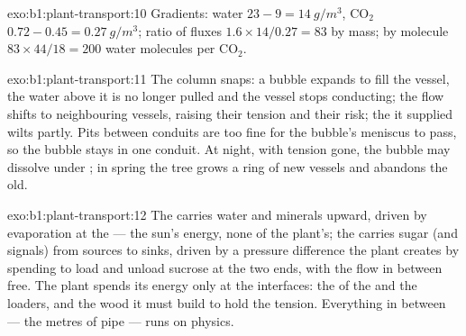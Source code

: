 \begin{solution}{exo:b1:plant-transport:10}
Gradients: water $23 - 9 = \qty{14}{g/m^3}$, $\mathrm{CO_2}$ $0.72 -
0.45 = \qty{0.27}{g/m^3}$; ratio of fluxes $1.6\times 14/0.27 = 83$ by
mass; by molecule $83\times 44/18 = 200$ water molecules per
$\mathrm{CO_2}$.
\end{solution}

\begin{solution}{exo:b1:plant-transport:11}
The column snaps: a bubble expands to fill the vessel, the water
above it is no longer pulled and the vessel stops conducting; the
flow shifts to neighbouring vessels, raising their tension and their
risk; the  it supplied wilts partly. Pits between conduits are
too fine for the bubble's meniscus to pass, so the bubble stays in one
conduit. At night, with tension gone, the bubble may dissolve under
; in spring the tree grows a ring of new vessels and
abandons the old.
\end{solution}

\begin{solution}{exo:b1:plant-transport:12}
The  carries water and minerals upward, driven by evaporation at
the  --- the sun's energy, none of the plant's; the 
carries sugar (and signals) from sources to sinks, driven by a
pressure difference the plant creates by spending  to load and
unload sucrose at the two ends, with the flow in between free. The
plant spends its energy only at the interfaces: the  of
the  and the  loaders, and the wood it must build to
hold the tension. Everything in between --- the metres of pipe --- runs
on physics.
\end{solution}

